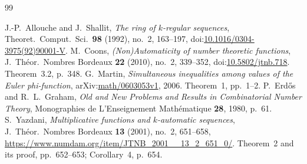 \documentclass[11pt]{article}
\begin{document}
\begin{thebibliography}{99}\small
\raggedright
{} J.-P.~Allouche and J.~Shallit,
\emph{The ring of $k$-regular sequences}, Theoret.\ Comput.\ Sci.\
\textbf{98} (1992), no.~2, 163--197,
doi:\href{https://doi.org/10.1016/0304-3975(92)90001-V}{10.1016/0304-3975(92)90001-V}.
\bibitem{coons} M.~Coons, \emph{(Non)Automaticity of number theoretic
functions}, J.\ Th\'eor.\ Nombres Bordeaux \textbf{22} (2010), no.~2, 339--352,
doi:\href{https://doi.org/10.5802/jtnb.718}{10.5802/jtnb.718}.
Theorem~3.2, p.~348.
 G.~Martin, \emph{Simultaneous inequalities
among values of the Euler phi-function},
arXiv:\href{https://arxiv.org/abs/math/0603053v1}{math/0603053v1}, 2006.
Theorem~1, pp.~1--2.
 P.~Erd\H{o}s and R.~L.~Graham,
\emph{Old and New Problems and Results in Combinatorial Number Theory},
Monographies de L'Enseignement Math\'ematique \textbf{28}, 1980, p.~61.
\bibitem{yazdani2001} S.~Yazdani,
\emph{Multiplicative functions and $k$-automatic sequences},
J.\ Th\'eor.\ Nombres Bordeaux \textbf{13} (2001), no.~2, 651--658,
\url{https://www.numdam.org/item/JTNB_2001__13_2_651_0/}.
Theorem~2 and its proof, pp.~652--653; Corollary~4, p.~654.
\end{thebibliography}
\end{document}
